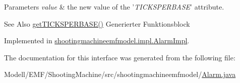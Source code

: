 \begin{DoxyParams}{Parameters}
{\em value} & the new value of the '{\itshape T\-I\-C\-K\-S\-P\-E\-R\-B\-A\-S\-E}' attribute. \\
\hline
\end{DoxyParams}
\begin{DoxySeeAlso}{See Also}
\hyperlink{interfaceshootingmachineemfmodel_1_1_alarm_ada895bdbb794428a1f71ba70acaf7fa3}{get\-T\-I\-C\-K\-S\-P\-E\-R\-B\-A\-S\-E()} Generierter Funktionsblock 
\end{DoxySeeAlso}


Implemented in \hyperlink{classshootingmachineemfmodel_1_1impl_1_1_alarm_impl_aec664170d257fedd50991d76fc22da59}{shootingmachineemfmodel.\-impl.\-Alarm\-Impl}.



The documentation for this interface was generated from the following file\-:\begin{DoxyCompactItemize}
\item 
Modell/\-E\-M\-F/\-Shooting\-Machine/src/shootingmachineemfmodel/\hyperlink{_alarm_8java}{Alarm.\-java}\end{DoxyCompactItemize}
